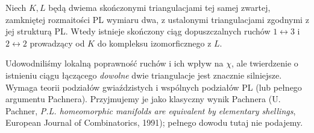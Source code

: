 \begin{twierdzenie}
Niech $K,L$ będą dwiema skończonymi triangulacjami
tej samej zwartej, zamkniętej rozmaitości PL
wymiaru dwa, z ustalonymi triangulacjami zgodnymi
z jej strukturą PL.
Wtedy istnieje skończony ciąg dopuszczalnych ruchów
$1\leftrightarrow3$ i $2\leftrightarrow2$ prowadzący
od $K$ do kompleksu izomorficznego z $L$.
\end{twierdzenie}

\begin{uwaga}
Udowodniliśmy lokalną poprawność ruchów i ich wpływ na
$\chi$, ale twierdzenie o istnieniu ciągu łączącego
\emph{dowolne} dwie triangulacje jest znacznie silniejsze.
Wymaga teorii podziałów gwiaździstych i wspólnych
podziałów PL (lub pełnego argumentu Pachnera).
Przyjmujemy je jako klasyczny wynik Pachnera
(U. Pachner, \emph{P.L. homeomorphic manifolds are
equivalent by elementary shellings}, European Journal of
Combinatorics, 1991); pełnego dowodu tutaj nie podajemy.
\end{uwaga}

